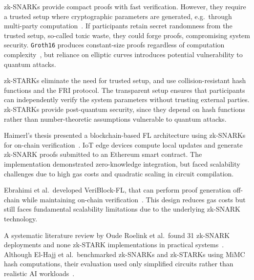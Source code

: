 \documentclass[runningheads]{llncs}
\begin{document}
zk-SNARKs provide compact proofs with fast verification.
However, they require a trusted setup where cryptographic parameters are generated, e.g.~through multi-party computation~\cite{firstzksnark}.
If participants retain secret randomness from the trusted setup, so-called toxic waste, they could forge proofs, compromising system security. {\tt Groth16} produces constant-size proofs regardless of computation complexity~\cite{groth16}, but reliance on elliptic curves introduces potential vulnerability to quantum attacks.

zk-STARKs eliminate the need for trusted setup, and use collision-resistant hash functions and the FRI protocol. The transparent setup ensures that participants can independently verify the system parameters without trusting external parties. zk-STARKs provide post-quantum security, since they depend on hash functions rather than number-theoretic assumptions vulnerable to quantum attacks.


Haimerl's thesis presented a blockchain-based FL architecture using zk-SNARKs for on-chain verification~\cite{msthesis}. IoT edge devices compute local updates and generate zk-SNARK proofs submitted to an Ethereum smart contract.
The implementation demonstrated zero-knowledge integration, but faced scalability challenges due to high gas costs and quadratic scaling in circuit compilation.

Ebrahimi et al.~developed VeriBlock-FL, that can perform proof generation off-chain while maintaining on-chain verification~\cite{mainflzkp}. This design reduces gas costs but still faces fundamental scalability limitations due to the underlying zk-SNARK technology.

A systematic literature review by Oude Roelink et al.~found 31 zk-SNARK deployments and none zk-STARK implementations in practical systems~\cite{oude2024systematic}.
Although El-Hajj et al.~benchmarked zk-SNARKs and zk-STARKs using MiMC hash computations, their evaluation used only simplified circuits rather than realistic AI workloads~\cite{evaluatingzkp}.
\end{document}
